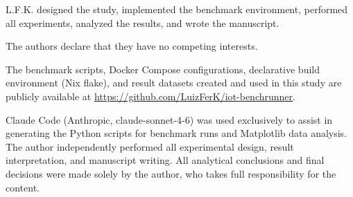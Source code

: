 \documentclass[english]{presets/sbcreviews-2025}%
\begin{document}







\begin{declarations}

  \begin{contributions}
    L.F.K. designed the study, implemented the benchmark environment, performed all experiments,
    analyzed the results, and wrote the manuscript.
  \end{contributions}

  \begin{interests}
    The authors declare that they have no competing interests.
  \end{interests}

  \begin{materials}
    The benchmark scripts, Docker Compose configurations, declarative build environment
    (Nix flake), and result datasets created and used in this study are publicly available at
    \url{https://github.com/LuizFerK/iot-benchrunner}.
  \end{materials}

  \begin{aitools}
    Claude Code (Anthropic, claude-sonnet-4-6) was used exclusively to assist in generating the Python scripts for benchmark runs and Matplotlib data analysis. The author independently performed all experimental design, result interpretation, and manuscript writing. All analytical conclusions and final decisions were made solely by the author, who takes full responsibility for the content.
  \end{aitools}

\end{declarations}



\end{document}
